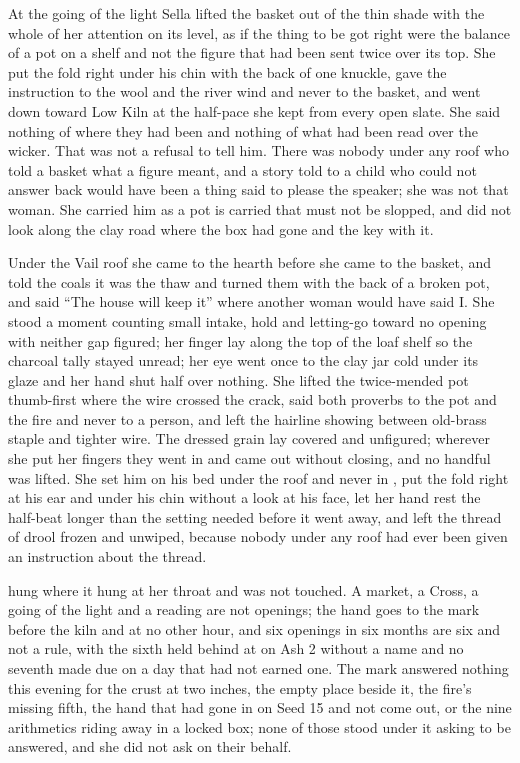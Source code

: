 \scenebreak

At the going of the light Sella lifted the basket out of the thin shade with the whole of her attention on its level, as if the thing to be got right were the balance of a pot on a shelf and not the figure that had been sent twice over its top. She put the fold right under his chin with the back of one knuckle, gave the instruction to the wool and the river wind and never to the basket, and went down toward Low Kiln at the half-pace she kept from every open slate. She said nothing of where they had been and nothing of what had been read over the wicker. That was not a refusal to tell him. There was nobody under any roof who told a basket what a figure meant, and a story told to a child who could not answer back would have been a thing said to please the speaker; she was not that woman. She carried him as a pot is carried that must not be slopped, and did not look along the clay road where the box had gone and the key with it.

Under the Vail roof she came to the hearth before she came to the basket, and told the coals it was the thaw and turned them with the back of a broken pot, and said “The house will keep it” where another woman would have said I. She stood a moment counting small intake, hold and letting-go toward no opening with neither gap figured; her finger lay along the top of the loaf shelf so the charcoal tally stayed unread; her eye went once to the clay jar cold under its glaze and her hand shut half over nothing. She lifted the twice-mended pot thumb-first where the wire crossed the crack, said both proverbs to the pot and the fire and never to a person, and left the hairline showing between old-brass staple and tighter wire. The dressed grain lay covered and unfigured; wherever she put her fingers they went in and came out without closing, and no handful was lifted. She set him on his bed under the roof and never in , put the fold right at his ear and under his chin without a look at his face, let her hand rest the half-beat longer than the setting needed before it went away, and left the thread of drool frozen and unwiped, because nobody under any roof had ever been given an instruction about the thread.

 hung where it hung at her throat and was not touched. A market, a Cross, a going of the light and a reading are not openings; the hand goes to the mark before the kiln and at no other hour, and six openings in six months are six and not a rule, with the sixth held behind at  on Ash 2 without a name and no seventh made due on a day that had not earned one. The mark answered nothing this evening for the crust at two inches, the empty place beside it, the fire's missing fifth, the hand that had gone in on Seed 15 and not come out, or the nine arithmetics riding away in a locked box; none of those stood under it asking to be answered, and she did not ask on their behalf.

